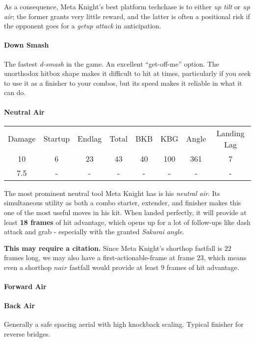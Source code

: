 As a consequence, Meta Knight's best platform techchase is to either \textit{up tilt} or \textit{up air}; the former grants very little reward, and the latter is often a positional risk if the opponent goes for a \textit{getup attack} in anticipation.

\paragraph{Down Smash}
The fastest \textit{d-smash} in the game. An excellent ``get-off-me'' option. The unorthodox hitbox shape makes it difficult to hit at times, particularly if you seek to use it as a finisher to your combos, but its speed makes it reliable in what it can do.

\paragraph{Neutral Air}
\begin{center}
	\begin{tabular}{| c | c  c  c | c  c  c | c |}
		\hline
		Damage &	Startup	& Endlag & Total & BKB & KBG & Angle &	Landing Lag	\\
		10	&	6	&	23	&	43	&	40	&	100 & 	361\deg	&	7 		\\
		7.5	&	-	&	-	&	-	&	- 	& 	- 	&	-		&	-		\\
		\hline
	\end{tabular}
\end{center}
The most prominent neutral tool Meta Knight has is his \textit{neutral air}. Its simultaneous utility as both a combo starter, extender, and finisher makes this one of the most useful moves in his kit. When landed perfectly, it will provide at least \textbf{18 frames} of hit advantage, which opens up for a lot of follow-ups like dash attack and grab - especially with the granted \textit{Sakurai angle}. 

\textbf{This may require a citation.} Since Meta Knight's shorthop fastfall is $22$ frames long, we may also have a first-actionable-frame at frame $23$, which means even a shorthop $nair$ fastfall would provide at least 9 frames of hit advantage.
\paragraph{Forward Air}
\paragraph{Back Air}
Generally a safe spacing aerial with high knockback scaling. Typical finisher for reverse bridges.
